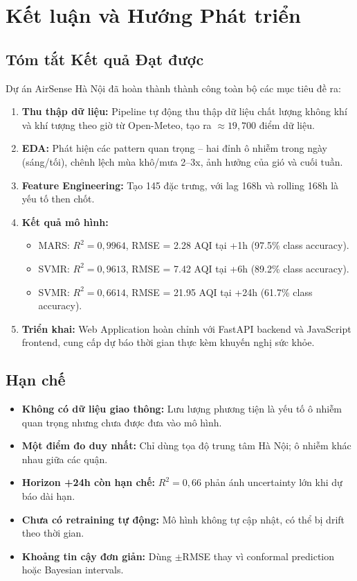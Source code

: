 \documentclass[12pt,a4paper]{report}
\begin{document}
\chapter{Kết luận và Hướng Phát triển}

\section{Tóm tắt Kết quả Đạt được}

Dự án AirSense Hà Nội đã hoàn thành thành công toàn bộ các mục tiêu đề ra:

\begin{enumerate}
  \item \textbf{Thu thập dữ liệu:} Pipeline tự động thu thập dữ liệu chất lượng không khí và khí tượng theo giờ từ Open-Meteo, tạo ra $\approx 19{,}700$ điểm dữ liệu.
  \item \textbf{EDA:} Phát hiện các pattern quan trọng -- hai đỉnh ô nhiễm trong ngày (sáng/tối), chênh lệch mùa khô/mưa 2--3x, ảnh hưởng của gió và cuối tuần.
  \item \textbf{Feature Engineering:} Tạo 145 đặc trưng, với lag 168h và rolling 168h là yếu tố then chốt.
  \item \textbf{Kết quả mô hình:}
    \begin{itemize}
      \item MARS: $R^2 = 0{,}9964$, RMSE = 2.28 AQI tại +1h (97.5\% class accuracy).
      \item SVMR: $R^2 = 0{,}9613$, RMSE = 7.42 AQI tại +6h (89.2\% class accuracy).
      \item SVMR: $R^2 = 0{,}6614$, RMSE = 21.95 AQI tại +24h (61.7\% class accuracy).
    \end{itemize}
  \item \textbf{Triển khai:} Web Application hoàn chỉnh với FastAPI backend và JavaScript frontend, cung cấp dự báo thời gian thực kèm khuyến nghị sức khỏe.
\end{enumerate}

\section{Hạn chế}

\begin{itemize}
  \item \textbf{Không có dữ liệu giao thông:} Lưu lượng phương tiện là yếu tố ô nhiễm quan trọng nhưng chưa được đưa vào mô hình.
  \item \textbf{Một điểm đo duy nhất:} Chỉ dùng tọa độ trung tâm Hà Nội; ô nhiễm khác nhau giữa các quận.
  \item \textbf{Horizon +24h còn hạn chế:} $R^2 = 0{,}66$ phản ánh uncertainty lớn khi dự báo dài hạn.
  \item \textbf{Chưa có retraining tự động:} Mô hình không tự cập nhật, có thể bị drift theo thời gian.
  \item \textbf{Khoảng tin cậy đơn giản:} Dùng $\pm$RMSE thay vì conformal prediction hoặc Bayesian intervals.
\end{itemize}
\end{document}
